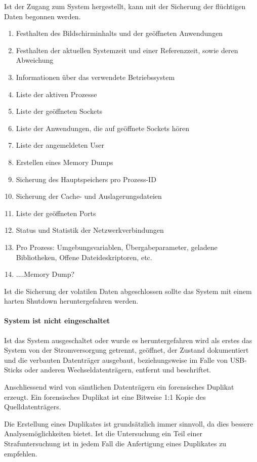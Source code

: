 Ist der Zugang zum System hergestellt, kann mit der Sicherung der flüchtigen Daten begonnen werden. 

\begin{enumerate}
\item Festhalten des Bildschirminhalts und der geöffneten Anwendungen
\item Festhalten der aktuellen Systemzeit und einer Referenzzeit, sowie deren Abweichung
\item Informationen über das verwendete Betriebssystem
\item Liste der aktiven Prozesse
\item Liste der geöffneten Sockets
\item Liste der Anwendungen, die auf geöffnete Sockets hören
\item Liste der angemeldeten User
\item Erstellen eines Memory Dumps
\item Sicherung des Hauptspeichers pro Prozess-ID
\item Sicherung der Cache- und Auslagerungsdateien
\item Liste der geöffneten Ports
\item Status und Statistik der Netzwerkverbindungen
\item Pro Prozess: Umgebungsvariablen, Übergabeparameter, geladene Bibliotheken, Offene Dateideskriptoren, etc.
\item ....Memory Dump?
\end{enumerate}


Ist die Sicherung der volatilen Daten abgeschlossen sollte das System mit einem harten Shutdown heruntergefahren werden.

\paragraph{System ist nicht eingeschaltet}
Ist das System ausgeschaltet oder wurde es heruntergefahren wird als erstes das System von der Stromversorgung getrennt, geöffnet, der Zustand dokumentiert und die verbauten Datenträger ausgebaut, beziehungsweise im Falle von USB-Sticks oder anderen Wechseldatenträgern, entfernt und beschriftet. 

Anschliessend wird von sämtlichen Datenträgern ein forensisches Duplikat erzeugt. Ein forensisches Duplikat ist eine Bitweise 1:1 Kopie des Quelldatenträgers.

Die Erstellung eines Duplikates ist grundsätzlich immer sinnvoll, da dies bessere Analysemöglichkeiten bietet. Ist die Untersuchung ein Teil einer Strafuntersuchung ist in jedem Fall die Anfertigung eines Duplikates zu empfehlen.

